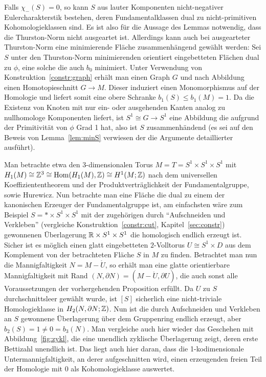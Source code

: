 \begin{bem}
    Falls $\chi_-(S)=0$, so kann $S$ aus lauter Komponenten nicht-negativer Eulercharakterstik bestehen, deren Fundamentalklassen dual zu nicht-primitiven Kohomologieklassen sind. Es ist also für die Aussage des Lemmas notwendig, dass die Thurston-Norm nicht ausgeartet ist. Allerdings kann auch bei ausgearteter Thurston-Norm eine minimierende Fläche zusammenhängend gewählt werden: Sei $S$ unter den Thurston-Norm minimierenden orientiert eingebetteten Flächen dual zu $\phi$, eine solche die auch $b_0$ minimiert. Unter Verwendung von Konstruktion~\ref{constr:graph} erhält man einen Graph $G$ und nach Abbildung einen Homotopieschnitt $G\to M$. Dieser induziert einen Monomorphismus auf der Homologie und liefert somit eine obere Schranke $b_1(S)\leq b_1(M)=1$. Da die Existenz von Knoten mit nur ein- oder ausgehenden Kanten analog zu  nullhomologe Komponenten liefert, ist $S^1\cong G\to S^1$ eine Abbildung die aufgrund der Primitivität von $\phi$ Grad 1 hat, also ist $S$ zusammenhändend (es sei auf den Beweis von Lemma~\ref{lem:minS} verwiesen der die Argumente detaillierter ausführt).
\end{bem}

    \begin{bsp}
    \label{bsp:SohnerandMmit}
     Man betrachte etwa den 3-dimensionalen Torus $M=T=S^1\times S^1 \times S^1$ mit $H_1(M)\cong\mathbb{Z}^3 \cong \operatorname{Hom}(H_1(M),\mathbb{Z}) \cong H^1(M;\mathbb{Z})$ nach dem universellen Koeffiziententheorem und der Produktverträglichkeit der Fundamentalgruppe, sowie Hurewicz. Nun betrachte man eine Fläche die dual zu einem der kanonischen Erzeuger der Fundamentalgruppe ist, am einfachsten wäre zum Beispiel $S=* \times S^1 \times S^1$ mit der zugehörigen durch "`Aufschneiden und Verkleben"' (vergleiche Konstruktion~\ref{constr:cut}, Kapitel~\ref{sec:constr}) gewonnenen Überlagerung $\mathbb{R} \times S^1 \times S^1$ die homologisch endlich erzeugt ist. Sicher ist es möglich einen glatt eingebetteten $2$-Volltorus $U\cong S^1\times D$ aus dem Komplement von der betrachteten Fläche $S$ in $M$ zu finden. Betrachtet man nun die Mannigfaltigkeit $N=M - \mathring U$, so erhält man eine glatte orientierbare Mannigfaltigkeit mit Rand $(N,\partial N)= (M- \mathring U, \partial U)$, die auch sonst alle Voraussetzungen der vorhergehenden Proposition erfüllt. Da $U$ zu $S$ durchschnittsleer gewählt wurde, ist $[S]$ sicherlich eine nicht-triviale Homologieklasse in $H_2(N,\partial N;\mathbb{Z})$. Nun ist die durch Aufschneiden und Verkleben an $S$ gewonnene Überlagerung über dem Gruppenring endlich erzeugt, aber $b_2(S)=1 \neq 0 = b_3(N)$. Man vergleiche auch hier wieder das Geschehen mit Abbildung~\ref{fig:zykl}, die eine unendlich zyklische Überlagerung zeigt, deren erste Bettizahl unendlich ist. Das liegt auch hier daran, dass die 1-kodimensionale Untermannigfaltigkeit, an derer aufgeschnitten wird, einen erzeugenden freien Teil der Homologie mit 0 als Kohomologieklasse auswertet.
    
    \end{bsp}

